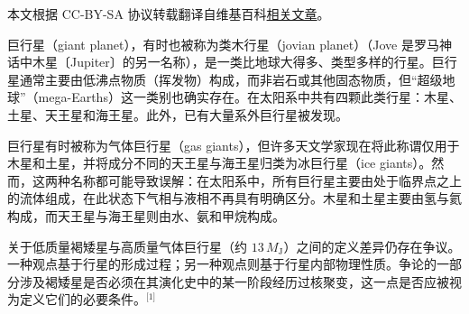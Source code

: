 
本文根据 CC-BY-SA 协议转载翻译自维基百科\href{https://en.wikipedia.org/wiki/Giant_planet}{相关文章}。

巨行星（giant planet），有时也被称为类木行星（jovian planet）（Jove 是罗马神话中木星〔Jupiter〕的另一名称），是一类比地球大得多、类型多样的行星。巨行星通常主要由低沸点物质（挥发物）构成，而非岩石或其他固态物质，但“超级地球”（mega-Earths）这一类别也确实存在。在太阳系中共有四颗此类行星：木星、土星、天王星和海王星。此外，已有大量系外巨行星被发现。

巨行星有时被称为气体巨行星（gas giants），但许多天文学家现在将此称谓仅用于木星和土星，并将成分不同的天王星与海王星归类为冰巨行星（ice giants）。然而，这两种名称都可能导致误解：在太阳系中，所有巨行星主要由处于临界点之上的流体组成，在此状态下气相与液相不再具有明确区分。木星和土星主要由氢与氦构成，而天王星与海王星则由水、氨和甲烷构成。

关于低质量褐矮星与高质量气体巨行星（约 \(13\,M_{\mathrm{J}}\)）之间的定义差异仍存在争议。一种观点基于行星的形成过程；另一种观点则基于行星内部物理性质。争论的一部分涉及褐矮星是否必须在其演化史中的某一阶段经历过核聚变，这一点是否应被视为定义它们的必要条件。\(^\text{[1]}\)
